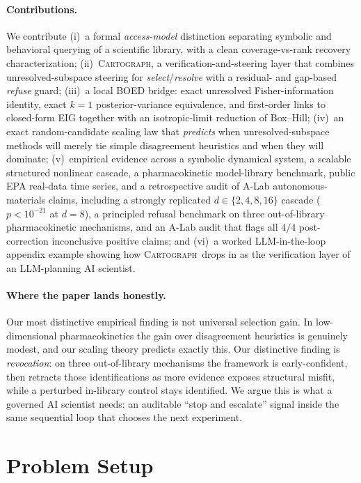 \documentclass{article}
\newcommand{\method}{\textsc{Cartograph}}
\theoremstyle{plain}
\theoremstyle{definition}
\theoremstyle{remark}
\begin{document}
\paragraph{Contributions.}
We contribute (i)~a formal \emph{access-model} distinction separating
symbolic and behavioral querying of a scientific library, with a clean
coverage-vs-rank recovery characterization; (ii)~\method, a
verification-and-steering layer that combines unresolved-subspace steering
for \emph{select}/\emph{resolve} with a residual- and gap-based
\emph{refuse} guard;
(iii)~a local BOED bridge: exact unresolved Fisher-information identity,
exact $k=1$ posterior-variance equivalence, and first-order links to
closed-form EIG together with an isotropic-limit reduction of Box--Hill;
(iv)~an exact random-candidate scaling law that
\emph{predicts} when unresolved-subspace methods will merely tie simple
disagreement heuristics and when they will dominate; (v)~empirical evidence
across a symbolic dynamical system, a scalable structured nonlinear cascade,
a pharmacokinetic model-library benchmark, public EPA real-data time
series, and a retrospective audit of A-Lab autonomous-materials claims,
including a strongly replicated $d\!\in\!\{2,4,8,16\}$ cascade
($p<10^{-21}$ at $d=8$), a principled refusal benchmark on three
out-of-library pharmacokinetic mechanisms, and an A-Lab audit that flags
all $4/4$ post-correction inconclusive positive claims; and (vi)~a worked LLM-in-the-loop
appendix example showing how \method\ drops in as the verification layer of
an LLM-planning AI scientist.

\paragraph{Where the paper lands honestly.}
Our most distinctive empirical finding is not universal selection gain. In
low-dimensional pharmacokinetics the gain over disagreement heuristics is
genuinely modest, and our scaling theory predicts exactly this. Our
distinctive finding is \emph{revocation}: on three out-of-library mechanisms
the framework is early-confident, then retracts those identifications as
more evidence exposes structural misfit, while a perturbed in-library
control stays identified. We argue this is what a governed AI scientist
needs: an auditable ``stop and escalate'' signal inside the same sequential
loop that chooses the next experiment.

\section{Problem Setup}
\end{document}
